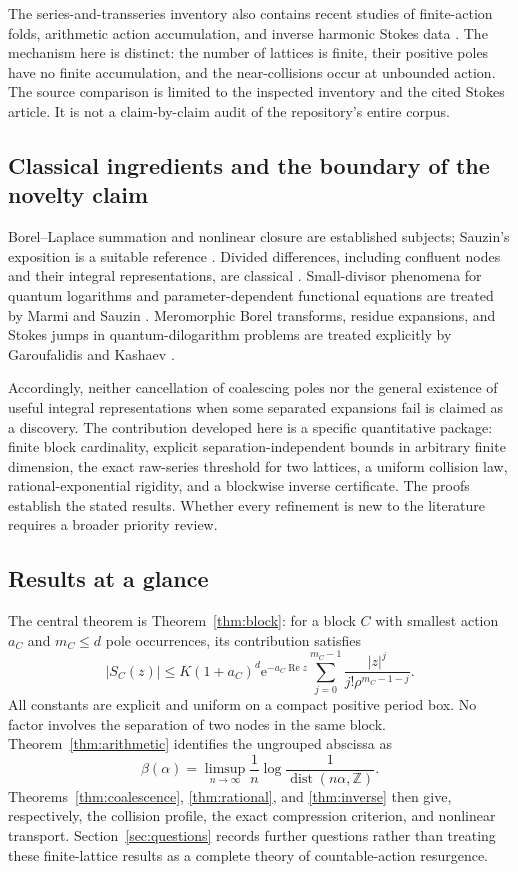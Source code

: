 \documentclass[11pt,a4paper]{article}
\numberwithin{equation}{section}
\theoremstyle{definition}
\theoremstyle{remark}
\newcommand{\e}{\mathrm e}
\newcommand{\re}{\operatorname{Re}}
\newcommand{\dist}{\operatorname{dist}}
\newcommand{\Z}{\mathbb Z}
\begin{document}
The series-and-transseries inventory also contains recent studies of
finite-action folds, arithmetic action accumulation, and inverse harmonic
Stokes data \cite{repo-index}. The mechanism here is distinct: the number
of lattices is finite, their positive poles have no finite accumulation,
and the near-collisions occur at unbounded action. The source comparison is
limited to the inspected inventory and the cited Stokes article. It is not
a claim-by-claim audit of the repository's entire corpus.

\subsection{Classical ingredients and the boundary of the novelty claim}
Borel--Laplace summation and nonlinear closure are established subjects;
Sauzin's exposition is a suitable reference \cite{sauzin}. Divided
differences, including confluent nodes and their integral representations,
are classical \cite{deboor}. Small-divisor phenomena for quantum logarithms
and parameter-dependent functional equations are treated by Marmi and
Sauzin \cite{marmi-sauzin}. Meromorphic Borel transforms, residue expansions,
and Stokes jumps in quantum-dilogarithm problems are treated explicitly by
Garoufalidis and Kashaev \cite{garoufalidis-kashaev}.

Accordingly, neither cancellation of coalescing poles nor the general
existence of useful integral representations when some separated
expansions fail is claimed as a discovery. The contribution developed here
is a specific quantitative package: finite block cardinality, explicit
separation-independent bounds in arbitrary finite dimension, the exact
raw-series threshold for two lattices, a uniform collision law,
rational-exponential rigidity, and a blockwise inverse certificate. The
proofs establish the stated results. Whether every refinement is new to
the literature requires a broader priority review.

\subsection{Results at a glance}
The central theorem is Theorem~\ref{thm:block}: for a block $C$ with smallest
action $a_C$ and $m_C\le d$ pole occurrences, its contribution satisfies
\[
 |S_C(z)|\le K(1+a_C)^d\e^{-a_C\re z}
 \sum_{j=0}^{m_C-1}\frac{|z|^j}{j!\rho^{m_C-1-j}}.
\]
All constants are explicit and uniform on a compact positive period box.
No factor involves the separation of two nodes in the same block.
Theorem~\ref{thm:arithmetic} identifies the ungrouped abscissa as
\[
 \beta(\alpha)=\limsup_{n\to\infty}\frac1n
 \log\frac1{\dist(n\alpha,\Z)}.
\]
Theorems~\ref{thm:coalescence}, \ref{thm:rational}, and \ref{thm:inverse}
then give, respectively, the collision profile, the exact compression
criterion, and nonlinear transport. Section~\ref{sec:questions} records
further questions rather than treating these finite-lattice results as a
complete theory of countable-action resurgence.
\end{document}

